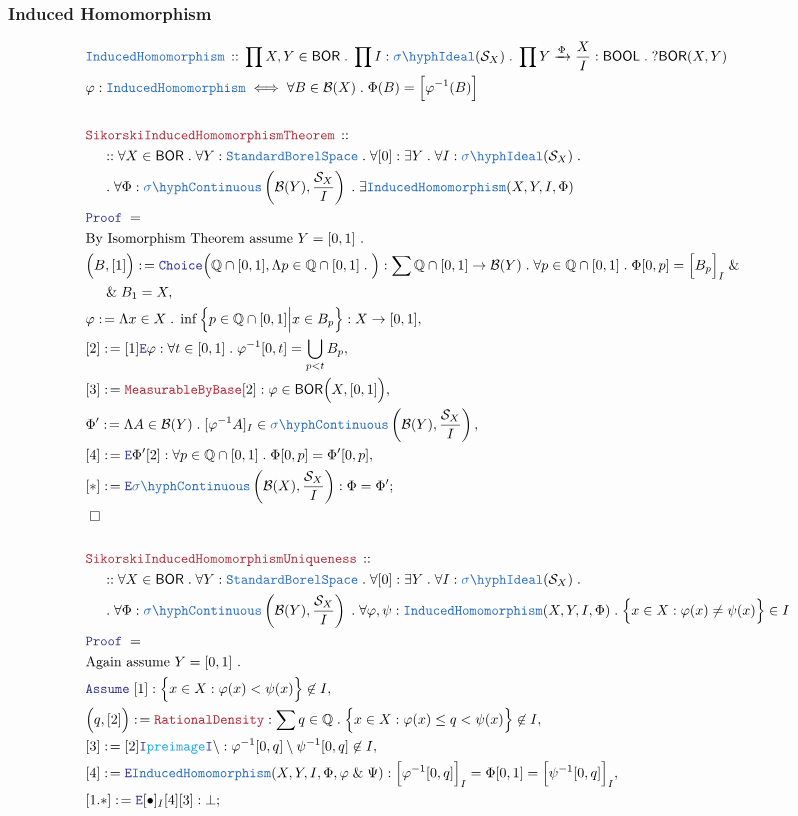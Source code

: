 \documentclass[12pt]{scrartcl}
\newcommand{\TYPE}[1]{\textcolor{NavyBlue}{\mathtt{#1}}}
\newcommand{\FUNC}[1]{\textcolor{Cerulean}{\mathtt{#1}}}
\newcommand{\LOGIC}[1]{\textcolor{Blue}{\mathtt{#1}}}
\newcommand{\THM}[1]{\textcolor{Maroon}{\mathtt{#1}}}
\renewcommand{\.}{\; . \;}
\newcommand{\de}{: \kern 0.1pc =}
\newcommand{\Theorem}[2]{& \THM{#1} \, :: \, #2 \\ & \Proof = \\ }
\newcommand{\DeclareType}[2]{& \TYPE{#1} \, :: \, #2 \\}
\newcommand{\DefineType}[3]{& #1 : \TYPE{#2} \iff #3 \\}
\newcommand{\NewLine}{\\ & \kern 1pc}
\newcommand{\Page}[1]{ \begin{align*} #1 \end{align*}   }
\renewcommand{\And}{\; \& \;}
\newcommand{\Intro}{\LOGIC{I}}
\newcommand{\Elim}{\LOGIC{E}}
\newcommand{\Rats}{\mathbb{Q} }
\newcommand{\Arrow}{\xrightarrow}
\newcommand{\Say}[3]{& #1 \de #2 : #3, \\}
\newcommand{\SayIn}[3]{& #1 \de #2 \in #3, \\}
\newcommand{\Conclude}[3]{& #1 \de #2 : #3; \\}
\newcommand{\Assume}[2]{& \LOGIC{Assume} \; #1 : #2, \\}
\newcommand{\QED}{\; \square}
\newcommand{\EndProof}{& \QED \\}
\newcommand{\Proof}{\LOGIC{Proof} \; }
\newcommand{\Explain}[1]{& \text{#1.} \\}
\newcommand{\Ideal}{\TYPE{Ideal}}
\newcommand{\SIdeal}{\TYPE{\sigma\hyph \Ideal}}
\newcommand{\B}{\mathcal{B}}
\newcommand{\sC}{\TYPE{\sigma\hyph Continuous}}
\newcommand{\BOOL}{\mathsf{BOOL}}
\newcommand{\SBS}{\TYPE{StandardBorelSpace}}
\newcommand{\IH}{\TYPE{InducedHomomorphism}}
\newcommand{\BOR}{\mathsf{BOR}}
\renewcommand{\S}{\mathcal{S}}
\begin{document}
\subsubsection{Induced Homomorphism}
\Page{
	\DeclareType{\IH}
	{
		\prod X,Y \in \BOR \. 
		\prod I : \SIdeal(\S_X) \.
		\prod Y \Arrow{\Phi} \frac{X}{I} : \BOOL \.
		? \BOR(X,Y) 
	}
	\DefineType{\varphi}{\IH}
	{\forall B \in \B(X) \. \Phi(B) = \Big[\varphi^{-1}(B)\Big]}	
	\\
	\Theorem{SikorskiInducedHomomorphismTheorem}
	{
		\NewLine ::		
		\forall X \in \BOR \.
		\forall Y : \SBS \.
		\forall [0] : \exists Y \.
		\forall I : \SIdeal(\S_X) \. \ \NewLine \.
		\forall \Phi : \sC\left(\B(Y), \frac{\S_X}{I}  \right) \.
		\exists  \IH(X,Y,I,\Phi)
	}
	\Explain{By Isomorphism Theorem assume $Y=[0,1]$ }
	\Say{\Big(B,[1]\Big)}{
		\LOGIC{Choice}\Big(
			\Rats \cap [0,1], 
			\Lambda p \in \Rats \cap [0,1] \. 
			\Big)
	}
	{
		\sum \Rats \cap [0,1] \to \B(Y) \.
		\forall p \in \Rats \cap [0,1] \. \Phi[0,p] = \Big[ B_p \Big]_I
		\And \NewLine \And
		B_1 = X
	}
	\Say{\varphi}{\Lambda x \in X \. \inf\Big\{ p \in \Rats \cap [0,1] \Big| x \in B_p \Big\} }
	{
		X \to [0,1]
	}
	\Say{[2]}{[1]\Elim \varphi}
	{
		\forall t \in [0,1] \. \varphi^{-1}[0,t]= \bigcup_{p < t} B_p
	}
	\Say{[3]}{\THM{MeasurableByBase}[2]}
	{
		\varphi \in \BOR\Big(X,[0,1]\Big)
	}
	\SayIn{\Phi'}{\Lambda A \in \B(Y) \. [\varphi^{-1} A]_I}
	{
		\sC\left(\B(Y), \frac{\S_X}{I} \right)	
	}
	\Say{[4]}{\Elim \Phi' [2]}
	{
		\forall p \in \Rats \cap [0,1] \. \Phi[0,p] = \Phi'[0,p]
	}
	\Conclude{[*]}{\Elim \sC\left( \B(X), \frac{\S_X}{I}  \right)}
	{
		\Phi = \Phi'
	}
	\EndProof
	\\
	\Theorem{SikorskiInducedHomomorphismUniqueness}
	{
		\NewLine ::		
		\forall X \in \BOR \.
		\forall Y : \SBS \.
		\forall [0] : \exists Y \.
		\forall I : \SIdeal(\S_X) \. \ \NewLine \.
		\forall \Phi : \sC\left(\B(Y), \frac{\S_X}{I}  \right) \.
		\forall \varphi,\psi :  \IH(X,Y,I,\Phi) \.
		\Big\{ x \in X : \varphi(x) \neq \psi(x)   \Big\} \in I
	}
	\Explain{Again assume $Y=[0,1]$ }
	\Assume{[1]}{ \Big\{ x \in X : \varphi(x) < \psi(x)   \Big\} \not \in I  }
	\Say{\Big(q, [2]\Big)}{\THM{RationalDensity}}
	{
		\sum q \in \Rats  \. 
		 \Big\{ x \in X : \varphi(x)  \le q < \psi(x)   \Big\} \not \in I
	}
	\Say{[3]}{[2]\Intro \FUNC{preimage}\Intro \setminus}
	{
		\varphi^{-1}[0,q] \setminus  \psi^{-1}[0,q] \not \in I
	}
	\Say{[4]}{\Elim \IH(X,Y,I,\Phi,\varphi \And \Psi)}
	{
		\Big[\varphi^{-1}[0,q]\Big]_I = \Phi[0,1] = \Big[\psi^{-1}[0,q]\Big]_I
	}
	\Conclude{[1.*]}{\Elim [\bullet]_I [4][3]}{\bot}
}
\end{document}

